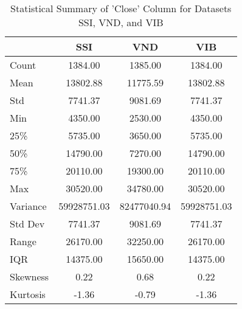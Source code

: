 \documentclass{ieeeojies}
\begin{document}
\begin{table}[H]
\renewcommand{\arraystretch}{1.5}
\centering
\caption{Statistical Summary of 'Close' Column for Datasets SSI, VND, and VIB}
\label{tab:summary_statistics}
\begin{tabular}{lccc}

\rowcolor{headercolor}
\hline
\cellcolor{white} & \textbf{SSI} & \textbf{VND} &\textbf{VIB} \\ %
\hline
\cellcolor{firstcolcolor}Count & 1384.00 & 1385.00 & 1384.00 \\

\cellcolor{firstcolcolor}Mean & 13802.88 & 11775.59 & 13802.88 \\

\cellcolor{firstcolcolor}Std & 7741.37 & 9081.69 & 7741.37 \\

\cellcolor{firstcolcolor}Min & 4350.00 & 2530.00 & 4350.00 \\

\cellcolor{firstcolcolor}25\% & 5735.00 & 3650.00 & 5735.00 \\

\cellcolor{firstcolcolor}50\% & 14790.00 & 7270.00 & 14790.00 \\

\cellcolor{firstcolcolor}75\% & 20110.00 & 19300.00 & 20110.00 \\

\cellcolor{firstcolcolor}Max & 30520.00 & 34780.00 & 30520.00 \\

\cellcolor{firstcolcolor}Variance & 59928751.03 & 82477040.94 & 59928751.03 \\

\cellcolor{firstcolcolor}Std Dev & 7741.37 & 9081.69 & 7741.37 \\

\cellcolor{firstcolcolor}Range & 26170.00 & 32250.00 & 26170.00 \\

\cellcolor{firstcolcolor}IQR & 14375.00 & 15650.00 & 14375.00 \\

\cellcolor{firstcolcolor}Skewness & 0.22 & 0.68 & 0.22 \\

\cellcolor{firstcolcolor}Kurtosis & -1.36 & -0.79 & -1.36 \\
\hline
\end{tabular}
\end{table}
\end{document}
